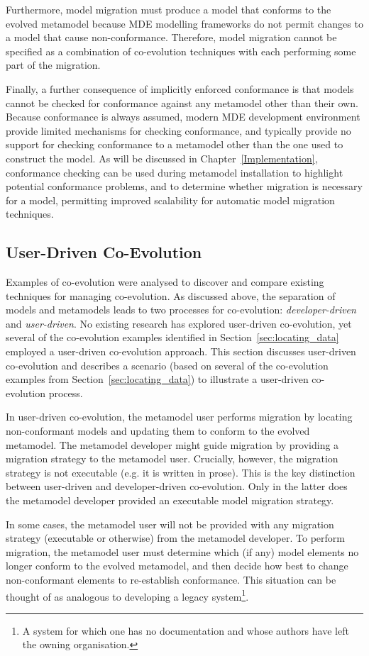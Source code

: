 Furthermore, model migration must produce a model that conforms to the evolved metamodel because MDE modelling frameworks do not permit changes to a model that cause non-conformance. Therefore, model migration cannot be specified as a combination of co-evolution techniques with each performing some part of the migration.

Finally, a further consequence of implicitly enforced conformance is that models cannot be checked for conformance against any metamodel other than their own. Because conformance is always assumed, modern MDE development environment provide limited mechanisms for checking conformance, and typically provide no support for checking conformance to a metamodel other than the one used to construct the model. As will be discussed in Chapter~\ref{Implementation}, conformance checking can be used during metamodel installation to highlight potential conformance problems, and to determine whether migration is necessary for a model, permitting improved scalability for automatic model migration techniques.


\subsection{User-Driven Co-Evolution}
Examples of co-evolution were analysed to discover and compare existing techniques for managing co-evolution. As discussed above, the separation of models and metamodels leads to two processes for co-evolution: \emph{developer-driven} and \emph{user-driven}. No existing research has explored user-driven co-evolution, yet several of the co-evolution examples identified in Section~\ref{sec:locating_data} employed a user-driven co-evolution approach. This section discusses user-driven co-evolution and describes a scenario (based on several of the co-evolution examples from Section~\ref{sec:locating_data}) to illustrate a user-driven co-evolution process.

In user-driven co-evolution, the metamodel user performs migration by locating non-conformant models and updating them to conform to the evolved metamodel. The metamodel developer might guide migration by providing a migration strategy to the metamodel user. Crucially, however, the migration strategy is not executable (e.g. it is written in prose). This is the key distinction between user-driven and developer-driven co-evolution. Only in the latter does the metamodel developer provided an executable model migration strategy.  

In some cases, the metamodel user will not be provided with any migration strategy (executable or otherwise) from the metamodel developer. To perform migration, the metamodel user must determine which (if any) model elements no longer conform to the evolved metamodel, and then decide how best to change non-conformant elements to re-establish conformance. This situation can be thought of as analogous to developing a legacy system\footnote{A system for which one has no documentation and whose authors have left the owning organisation.}.

